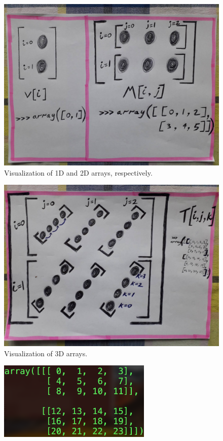 \newpage
\begin{figure}[ht]
\centering
\includegraphics[width=1.00\textwidth]{./images/1d_2d_array.jpg}
\caption{
Visualization of 1D and 2D arrays, respectively.
}
\label{fig:1d_2d_array}
\end{figure}

\newpage
\begin{figure}[ht]
\centering
\includegraphics[width=1.00\textwidth]{./images/3d_array.jpg}
\caption{
Visualization of 3D arrays.
}
\label{fig:3d_array}
\end{figure}

\vspace{\baselineskip}
\vspace{\baselineskip}
\vspace{\baselineskip}
\vspace{\baselineskip}

\begin{figure}[ht]
\centering
\includegraphics[width=0.65\textwidth]{./images/3d_array_print}
\label{fig:3d_array_print}
\end{figure}

\newpage
